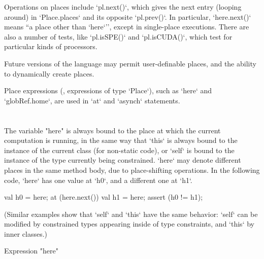Operations on places include \xcd`pl.next()`, which gives the next entry
(looping around) in \xcd`Place.places` and its opposite \xcd`pl.prev()`. In
particular, \xcd`here.next()` means ``a place other than \xcd`here`'', except
in single-place executions.
There are also a number of tests, like \xcd`pl.isSPE()` and 
\xcd`pl.isCUDA()`, which test for particular kinds of processors.

Future versions of the language may permit user-definable
places, and the ability to dynamically create places.

Place expressions  (\viz, expressions of type
\xcd`Place`), such as \xcd`here` 
and \xcd`globRef.home`, are used in \xcd`at` and
\xcd`asynch` statements.  



\section{}\label{Here}

The variable \xcd"here" is always bound to the place at which the current
computation is running, in the same way that \xcd`this` is always bound to the
instance of the current class (for non-static code), or \xcd`self` is bound to
the instance of the type currently being constrained.  
\xcd`here` may denote different places in the same method body, due to
place-shifting operations. In the following code, \xcd`here` has one value at
\xcd`h0`, and a different one at \xcd`h1`. 
\begin{xten}
val h0 = here;
at (here.next()) {
  val h1 = here; 
  assert (h0 != h1);
}
\end{xten}
\noindent
(Similar examples show that \xcd`self` and \xcd`this` have the same behavior:
\xcd`self` can be modified by constrained types appearing inside of type
constraints, and \xcd`this` by inner classes.)


\begin{grammar}
Expression \: \xcd"here" \\
\end{grammar}



